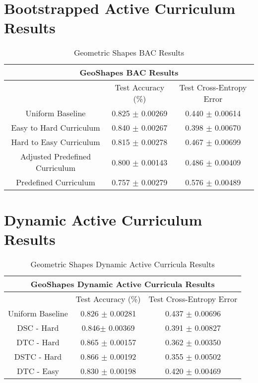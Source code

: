 
\appendix
\chapter{Bootstrapped Active Curriculum Results}
\begin{table}[h]
\caption{Geometric Shapes BAC Results} \label{tab:GeoShapes BACResults}
\begin{tabular}{|c||c|c|}
\hline
\multicolumn{3}{|c|}{GeoShapes BAC Results} \\
\hline
 & Test Accuracy (\%) & Test Cross-Entropy Error \\
\hline
Uniform Baseline&  0.825 $\pm$ 0.00269 & 0.440 $\pm$ 0.00614 \\
\hline
Easy to Hard Curriculum & 0.840 $\pm$ 0.00267 & 0.398 $\pm$ 0.00670 \\
\hline
Hard to Easy Curriculum &  0.815 $\pm$ 0.00278 & 0.467 $\pm$ 0.00699 \\
\hline
Adjusted Predefined Curriculum & 0.800 $\pm$ 0.00143 & 0.486 $\pm$ 0.00409 \\
\hline
Predefined Curriculum & 0.757 $\pm$ 0.00279 & 0.576 $\pm$ 0.00489 \\
\hline
\end{tabular}
\end{table}

\chapter{Dynamic Active Curriculum Results}
\begin{table}[h!]
\caption{Geometric Shapes Dynamic Active Curricula Results} \label{tab:GeoShapes DACResults}
\begin{tabular}{|c||c|c|}
\hline
\multicolumn{3}{|c|}{GeoShapes Dynamic Active Curricula Results} \\
\hline
 & Test Accuracy (\%) & Test Cross-Entropy Error \\
\hline
Uniform Baseline&  0.826 $\pm$ 0.00281 & 0.437 $\pm$ 0.00696 \\
\hline
DSC - Hard& 0.846$ \pm$ 0.00369 & 0.391 $\pm$ 0.00827 \\
\hline
DTC - Hard&  0.865  $\pm$ 0.00157 & 0.362 $\pm$ 0.00350 \\
\hline
DSTC - Hard & 0.866 $\pm$ 0.00192 & 0.355 $\pm$ 0.00502 \\
\hline
DTC - Easy & 0.830 $\pm$ 0.00198 & 0.420 $\pm$ 0.00469 \\
\hline
\end{tabular}
\end{table}

